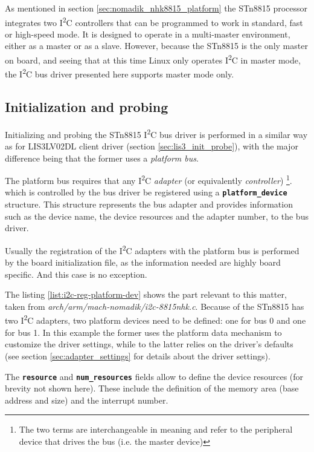 \documentclass[a4paper,10pt]{article}
\newcommand{\iic}{I\textsuperscript{2}C }
\newcommand{\keyword}[1]{\texttt{\textbf{#1}}}
\begin{document}
\begin{multicols}{2}
As mentioned in section \ref{sec:nomadik_nhk8815_platform} the STn8815 processor
integrates two \iic controllers that can be programmed to work in standard, fast
or high-speed mode. It is designed to operate in a multi-master environment,
either as a master or as a slave. However, because the STn8815 is the only master
on board, and seeing that at this time Linux only operates \iic in master mode, 
the \iic bus driver presented here supports master mode only.


\subsection{Initialization and probing}
\label{sec:adapter_init_probe}
Initializing and probing the STn8815 \iic bus driver is performed in a similar
way as for LIS3LV02DL client driver (section \ref{sec:lis3_init_probe}), with
the major difference being that the former uses a \emph{platform bus}.

The platform bus requires that any \iic \emph{adapter} (or equivalently
\emph{controller})
\footnote{The two terms are interchangeable in meaning and refer to the
peripheral device that drives the bus (i.e. the master device)}.
which is controlled by the bus driver be registered using a \keyword{platform\_device} structure.
This structure represents the bus adapter and provides information such as the
device name, the device resources and the adapter number, to the bus driver.

Usually the registration of the \iic adapters with the platform bus is
performed by the board initialization file, as the information needed are
highly board specific. And this case is no exception.

The listing \ref{list:i2c-reg-platform-dev} shows the part relevant to this
matter, taken from \emph{arch/arm/mach-nomadik/i2c-8815nhk.c}. Because of the
STn8815 has two \iic adapters, two platform devices need to be defined: one for
bus 0 and one for bus 1.
In this example the former uses the platform data mechanism to customize the
driver settings, while to the latter relies on the driver's defaults
(see section \ref{sec:adapter_settings} for details about the driver settings).

The \keyword{resource} and \keyword{num\_resources} fields allow to define
the device resources (for brevity not shown here). These include the
definition of the memory area (base address and size) and the interrupt number.


\end{multicols}
\end{document}
